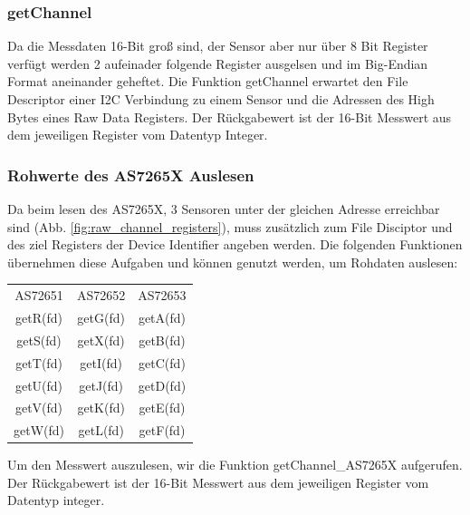 \subsubsection{getChannel}
Da die Messdaten 16-Bit groß sind, der Sensor aber nur über 8 Bit Register verfügt werden 2 aufeinader folgende Register ausgelsen und im Big-Endian Format aneinander geheftet.
Die Funktion getChannel erwartet den File Descriptor einer I2C Verbindung zu einem Sensor und die Adressen des High Bytes eines Raw Data Registers.
Der Rückgabewert ist der 16-Bit Messwert aus dem jeweiligen Register vom Datentyp Integer.\\



\subsubsection{Rohwerte des AS7265X Auslesen}
Da beim lesen des AS7265X, 3 Sensoren unter der gleichen Adresse erreichbar sind (Abb. \ref{fig:raw_channel_registers}), muss zusätzlich zum File Disciptor und des ziel Registers der Device Identifier angeben werden.
Die folgenden Funktionen übernehmen diese Aufgaben und können genutzt werden, um Rohdaten auslesen:
\begin{center}
\begin{tabular}{ c c c }
 	AS72651 & AS72652 & AS72653 \\ 
 	getR(fd) & getG(fd) & getA(fd) \\  
 	getS(fd) & getX(fd) & getB(fd) \\
 	getT(fd) & getI(fd) & getC(fd) \\  
 	getU(fd) & getJ(fd) & getD(fd) \\
 	getV(fd) & getK(fd) & getE(fd) \\  
 	getW(fd) & getL(fd) & getF(fd) \\
\end{tabular}
\end{center}
Um den Messwert auszulesen, wir die Funktion getChannel\_AS7265X aufgerufen.\\
Der Rückgabewert ist der 16-Bit Messwert aus dem jeweiligen Register vom Datentyp integer.\\

%

